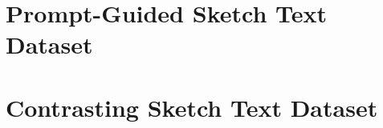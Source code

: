 

\section{Prompt-Guided Sketch Text Dataset} \label{datav1}


\section{Contrasting Sketch Text Dataset} \label{datav2}


